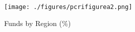 
\begin{figure}
    \centering
\texttt{[image: ./figures/pcrifigurea2.png]}
\caption{Funds by Region (\%)\label{fig:pcrifigurea2}}
\end{figure}
